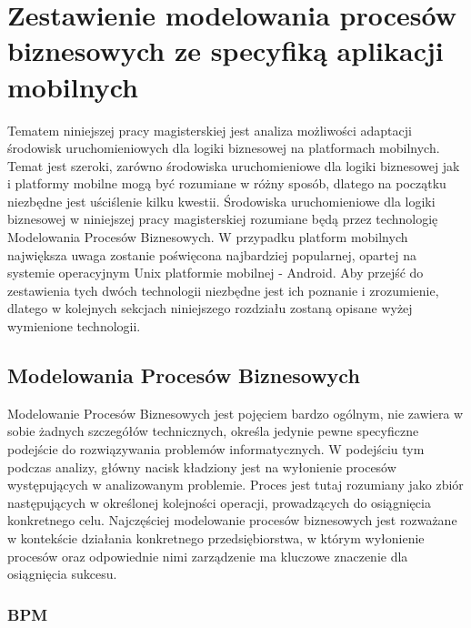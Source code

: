 \chapter{Zestawienie modelowania procesów biznesowych ze specyfiką aplikacji mobilnych}
\label{cha:bpmVSMobileApplications}

Tematem niniejszej pracy magisterskiej jest analiza możliwości adaptacji środowisk uruchomieniowych dla logiki biznesowej na platformach mobilnych. Temat jest szeroki, zarówno środowiska uruchomieniowe dla logiki biznesowej jak i platformy mobilne mogą być rozumiane w różny sposób, dlatego na początku niezbędne jest uściślenie kilku kwestii. Środowiska uruchomieniowe dla logiki biznesowej w niniejszej pracy magisterskiej rozumiane będą przez technologię Modelowania Procesów Biznesowych. W przypadku platform mobilnych największa uwaga zostanie poświęcona najbardziej popularnej, opartej na systemie operacyjnym Unix platformie mobilnej - Android. Aby przejść do zestawienia tych dwóch technologii niezbędne jest ich poznanie i zrozumienie, dlatego w kolejnych sekcjach niniejszego rozdziału zostaną opisane wyżej wymienione technologii.


\section{Modelowania Procesów Biznesowych}
\label{sec:analizaModelowaniaProcesowBiznesowych}

Modelowanie Procesów Biznesowych jest pojęciem bardzo ogólnym, nie zawiera w sobie żadnych szczegółów technicznych, określa jedynie pewne specyficzne podejście do rozwiązywania problemów informatycznych. W podejściu tym podczas analizy, główny nacisk kładziony jest na wyłonienie procesów występujących w analizowanym problemie. Proces jest tutaj rozumiany jako zbiór następujących w określonej kolejności operacji, prowadzących do osiągnięcia konkretnego celu. Najczęściej modelowanie procesów biznesowych jest rozważane w kontekście działania konkretnego przedsiębiorstwa, w którym wyłonienie procesów oraz odpowiednie nimi zarządzenie ma kluczowe znaczenie dla osiągnięcia sukcesu. 

\subsection{BPM}
\label{sec:bpm}

